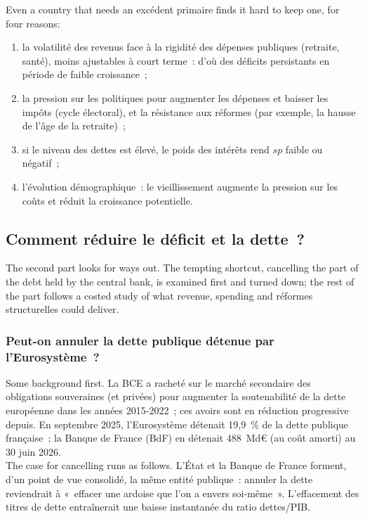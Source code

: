Even a country that needs an excédent primaire finds it hard to keep one, for four
reasons:
\begin{enumerate}
  \item la volatilité des revenus face à la rigidité des dépenses publiques
    (retraite, santé), moins ajustables à court terme~: d'où des déficits
    persistants en période de faible croissance~;
  \item la pression sur les politiques pour augmenter les dépenses et baisser
    les impôts (cycle électoral), et la résistance aux réformes (par exemple, la
    hausse de l'âge de la retraite)~;
  \item si le niveau des dettes est élevé, le poids des intérêts rend $sp$
    faible ou négatif~;
  \item l'évolution démographique~: le vieillissement augmente la pression sur
    les coûts et réduit la croissance potentielle.
\end{enumerate}

\subsection{Comment réduire le déficit et la dette~?}

The second part looks for ways out. The tempting shortcut, cancelling the part
of the debt held by the central bank, is examined first and turned down; the
rest of the part follows a costed study of what revenue, spending and
réformes structurelles could deliver.

\subsubsection{Peut-on annuler la dette publique détenue par l'Eurosystème~?}

Some background first. La BCE a racheté sur le marché secondaire des
obligations souveraines (et privées) pour augmenter la soutenabilité de la dette
européenne dans les années 2015-2022~; ces avoirs sont en réduction progressive
depuis. En septembre 2025, l'Eurosystème détenait 19,9~\% de la dette publique
française~; la Banque de France (BdF) en détenait 488~Md€ (au coût amorti) au
30 juin 2026.\\

The case for cancelling runs as follows. L'État et la Banque de France forment,
d'un point de vue consolidé, la même entité publique~: annuler la dette
reviendrait à «~effacer une ardoise que l'on a envers soi-même~». L'effacement
des titres de dette entraînerait une baisse instantanée du ratio dettes/PIB.

